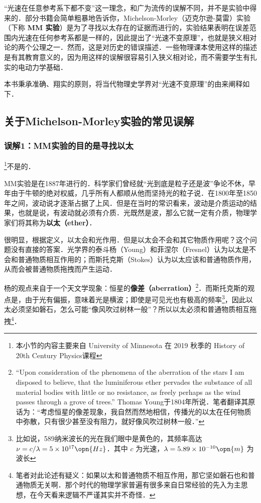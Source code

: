 

“光速在任意参考系下都不变”这一理念，和广为流传的误解不同，并不是实验中得来的．部分书籍会简单粗暴地告诉你，Michelson-Morley（迈克尔逊-莫雷）实验（下称 \textbf{MM 实验}）是为了寻找以太存在的证据而进行的，实验结果表明在误差范围内光速在任何参考系都是一样的，因此提出了“光速不变原理”，也就是狭义相对论的两个公理之一．然而，这是对历史的错误描述．一些物理课本使用这样的描述是有其教育意义的，因为用这样的误解很容易引入狭义相对论，而不需要学生有扎实的电动力学基础．

本书秉承准确、翔实的原则，将当代物理史学界对“光速不变原理”的由来阐释如下．

\subsection{关于Michelson-Morley实验的常见误解}

\subsubsection{误解1：MM实验的目的是寻找以太}

\footnote{本小节的内容主要来自 University of Minnesota 在 2019 秋季的 History of 20th Century Physics课程}不是的．

MM实验是在1887年进行的．科学家们曾经就“光到底是粒子还是波”争论不休，早年由于牛顿的绝对权威，几乎所有人都顺从他而坚持光的粒子说．在1800年至1850年之间，波动说才逐渐占据了上风．但是在当时的常识看来，波动是介质运动的结果，也就是说，有波动就必须有介质．光既然是波，那么它就一定有介质，物理学家们将其称为\textbf{以太（ether）}．

很明显，根据定义，以太会和光作用．但是以太会不会和其它物质作用呢？这个问题没有直接的答案．光学界的泰斗杨（Young）和菲涅尔（Fresnel）认为以太是不会和普通物质相互作用的；而斯托克斯（Stokes）认为以太应该和普通物质作用，从而会被普通物质拖拽而产生运动．

杨的观点来自于一个天文学现象：恒星的\textbf{像差（aberration）}\footnote{“Upon consideration of the phenomena
of the aberration of the stars I am disposed to believe, that the luminiferous ether pervades the substance of all material bodies with little or no resistance, as freely perhaps as the wind passes through a grove of trees.” Thomas Young于1804年所说．笔者翻译其原话为：“考虑恒星的像差现象，我自然而然地相信，传播光的以太在任何物质中弥散，只有很少甚至没有阻力，就好像风吹过树林一般．”}．而斯托克斯的观点是，由于光有偏振，意味着光是横波；即使是可见光也有极高的频率\footnote{比如说，589纳米波长的光在我们眼中是黄色的，其频率高达 $\nu=c/\lambda=5\times10^{17}\opn{Hz}$．其中 $c$ 为光速，$\lambda=5.89\times10^{-10}\opn{m}$ 为波长}，因此以太必须坚如磐石，怎么可能“像风吹过树林一般”？所以以太必须和普通物质相互拖拽\footnote{笔者对此论述有疑义：如果以太和普通物质不相互作用，那它坚如磐石也和普通物质无关啊．那个时代的物理学家普遍有很多来自日常经验的先入为主思想，在今天看来逻辑不严谨其实并不奇怪．}．%

